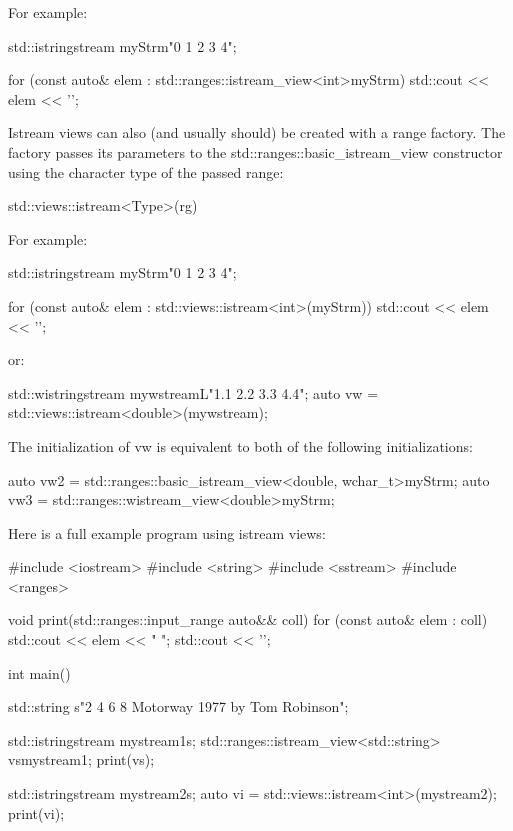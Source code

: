 For example:

\begin{cpp}
std::istringstream myStrm{"0 1 2 3 4"};

for (const auto& elem : std::ranges::istream_view<int>{myStrm}) {
	std::cout << elem << '\n';
}
\end{cpp}


Istream views can also (and usually should) be created with a range factory. The factory passes its parameters to the std::ranges::basic\_istream\_view constructor using the character type of the passed range:

\begin{cpp}
std::views::istream<Type>(rg)
\end{cpp}

For example:

\begin{cpp}
std::istringstream myStrm{"0 1 2 3 4"};

for (const auto& elem : std::views::istream<int>(myStrm)) {
	std::cout << elem << '\n';
}
\end{cpp}

or:

\begin{cpp}
std::wistringstream mywstream{L"1.1 2.2 3.3 4.4"};
auto vw = std::views::istream<double>(mywstream);
\end{cpp}

The initialization of vw is equivalent to both of the following initializations:

\begin{cpp}
auto vw2 = std::ranges::basic_istream_view<double, wchar_t>{myStrm};
auto vw3 = std::ranges::wistream_view<double>{myStrm};
\end{cpp}

Here is a full example program using istream views:


\begin{cpp}
#include <iostream>
#include <string>
#include <sstream>
#include <ranges>

void print(std::ranges::input_range auto&& coll)
{
	for (const auto& elem : coll) {
		std::cout << elem << " ";
	}
	std::cout << '\n';
}

int main()
{
	std::string s{"2 4 6 8 Motorway 1977 by Tom Robinson"};
	
	std::istringstream mystream1{s};
	std::ranges::istream_view<std::string> vs{mystream1};
	print(vs);
	
	std::istringstream mystream2{s};
	auto vi = std::views::istream<int>(mystream2);
	print(vi);
}
\end{cpp}

